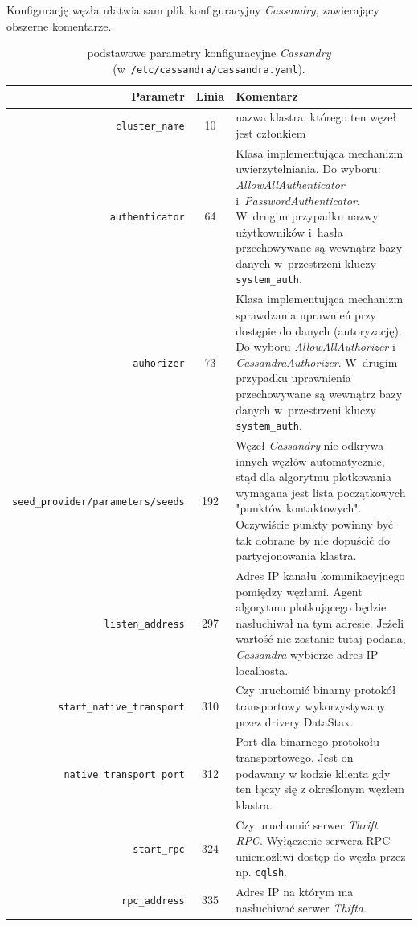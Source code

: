 \documentclass{article} %
\begin{document}
Konfigurację węzła ułatwia sam plik konfiguracyjny \emph{Cassandry}, zawierający obszerne komentarze.

\begin{table}[ht]
\caption{podstawowe parametry konfiguracyjne \emph{Cassandry} (w~\texttt{/etc/cassandra/cassandra.yaml}).}
\begin{tabular}{|r|c|p{7.5cm}|}
\hline 
\textbf{Parametr} & \textbf{Linia} & \textbf{Komentarz}\\
\hline
\hline
\texttt{cluster\_name} & 10 & nazwa klastra, którego ten węzeł jest członkiem\\
\hline
\texttt{authenticator} & 64 & Klasa implementująca mechanizm uwierzytelniania. Do wyboru: \emph{AllowAllAuthenticator} i~\emph{PasswordAuthenticator}. W~drugim przypadku nazwy użytkowników i~hasła przechowywane są wewnątrz bazy danych w~przestrzeni kluczy \texttt{system\_auth}.\\
\hline
\texttt{auhorizer} & 73 & Klasa implementująca mechanizm sprawdzania uprawnień przy dostępie do danych (autoryzację). Do wyboru \emph{AllowAllAuthorizer} i \emph{CassandraAuthorizer}. W~drugim przypadku uprawnienia przechowywane są wewnątrz bazy danych w~przestrzeni kluczy \texttt{system\_auth}.\\
\hline
\texttt{seed\_provider/parameters/seeds} & 192 & Węzeł \emph{Cassandry} nie odkrywa innych węzłów automatycznie, stąd dla algorytmu plotkowania wymagana jest lista początkowych "punktów kontaktowych". Oczywiście punkty powinny być tak dobrane by nie dopuścić do partycjonowania klastra.\\
\hline
\texttt{listen\_address} & 297 & Adres IP kanału komunikacyjnego pomiędzy węzłami. Agent algorytmu plotkującego będzie nasłuchiwał na tym adresie. Jeżeli wartość nie zostanie tutaj podana, \emph{Cassandra} wybierze adres IP localhosta.\\
\hline
\texttt{start\_native\_transport} & 310 & Czy uruchomić binarny protokół transportowy wykorzystywany przez drivery DataStax.\\
\hline
\texttt{native\_transport\_port} & 312 & Port dla binarnego protokołu transportowego. Jest on podawany w kodzie klienta gdy ten łączy się z określonym węzłem klastra.\\
\hline
\texttt{start\_rpc} & 324 & Czy uruchomić serwer \emph{Thrift RPC}. Wyłączenie serwera RPC uniemożliwi dostęp do węzła przez np. \texttt{cqlsh}.\\
\hline
\texttt{rpc\_address} & 335 & Adres IP na którym ma nasłuchiwać serwer \emph{Thifta}.\\
\hline
\end{tabular} 
\label{tab:config_options}
\end{table}
\end{document}
